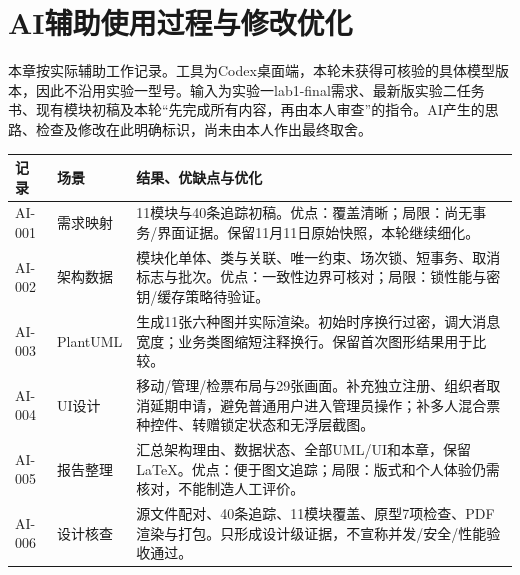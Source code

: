 \documentclass[UTF8,zihao=-4,fontset=windows]{ctexart}
\begin{document}
\clearpage

\section{AI辅助使用过程与修改优化}
本章按实际辅助工作记录。工具为Codex桌面端，本轮未获得可核验的具体模型版本，因此不沿用实验一型号。输入为实验一lab1-final需求、最新版实验二任务书、现有模块初稿及本轮“先完成所有内容，再由本人审查”的指令。AI产生的思路、检查及修改在此明确标识，尚未由本人作出最终取舍。

\begin{small}
\noindent\begin{tabularx}{\linewidth}{p{17mm}p{22mm}X}
\toprule
记录 & 场景 & 结果、优缺点与优化 \\ \midrule
AI-001 & 需求映射 & 11模块与40条追踪初稿。优点：覆盖清晰；局限：尚无事务/界面证据。保留11月11日原始快照，本轮继续细化。 \\
AI-002 & 架构数据 & 模块化单体、类与关联、唯一约束、场次锁、短事务、取消标志与批次。优点：一致性边界可核对；局限：锁性能与密钥/缓存策略待验证。 \\
AI-003 & PlantUML & 生成11张六种图并实际渲染。初始时序换行过密，调大消息宽度；业务类图缩短注释换行。保留首次图形结果用于比较。 \\
AI-004 & UI设计 & 移动/管理/检票布局与29张画面。补充独立注册、组织者取消延期申请，避免普通用户进入管理员操作；补多人混合票种控件、转赠锁定状态和无浮层截图。 \\
AI-005 & 报告整理 & 汇总架构理由、数据状态、全部UML/UI和本章，保留LaTeX。优点：便于图文追踪；局限：版式和个人体验仍需核对，不能制造人工评价。 \\
AI-006 & 设计核查 & 源文件配对、40条追踪、11模块覆盖、原型7项检查、PDF渲染与打包。只形成设计级证据，不宣称并发/安全/性能验收通过。 \\
\bottomrule
\end{tabularx}
\end{small}\par\smallskip

\clearpage
\end{document}
